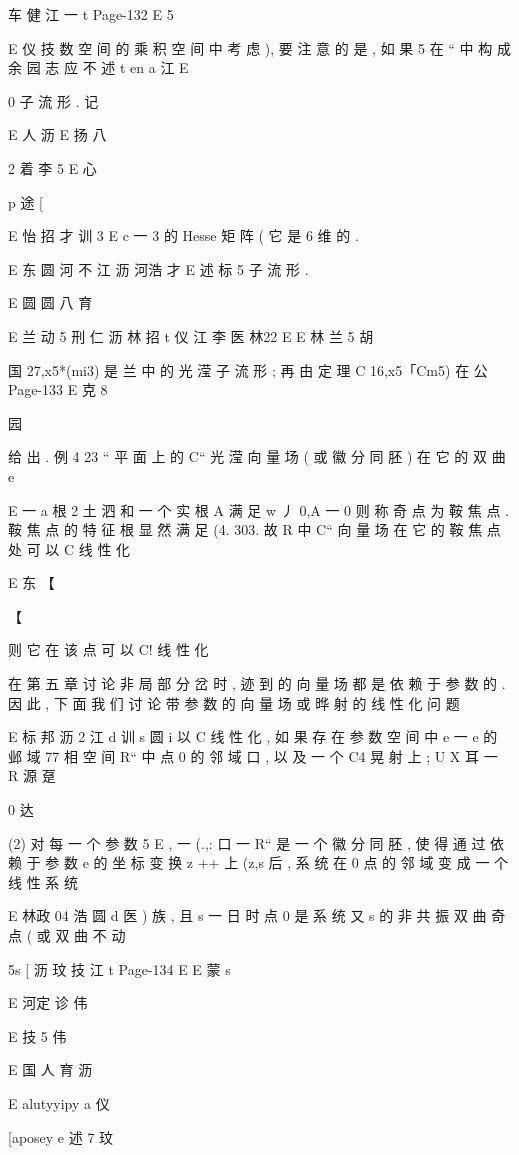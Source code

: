 {{{车 健 江 一 t
Page-132
E 5

E 仪 技
数 空 间 的 乘 积 空 间 中 考 虑 ), 要 注 意 的 是 , 如 果 5 在 “ 中 构 成 余
园 志 应 不 述
t en a 江
E

0
子 流 形 . 记

E 人 沥
E 扬 八

2 着 李 5
E 心

p 途 [

E 怡 招 才 训
3
E c 一 3
的 Hesse 矩 阵 ( 它 是 6 维 的 .

E 东 圆 河 不 江 沥 河浩 才
E 述 标 5
子 流 形 .

E 圆 圆 八 育

E 兰 动 5 刑 仁 沥 林 招 t 仪 江 李
医 林22
E
E 林 兰 5 胡

国
27,x5*(mi3) 是 兰 中 的 光 滢 子 流 形 ; 再 由 定 理 C 16,x5「Cm5) 在 公
Page-133
E 克 8

园

给 出 .
例 4 23 “ 平 面 上 的 C“ 光 滢 向 量 场 ( 或 徽 分 同 胚 ) 在 它 的 双 曲
e

E 一 a
根 2 土 泗 和 一 个 实 根 A 满 足 w 丿 0,A 一 0 则 称 奇 点 为 鞍 焦 点 . 鞍
焦 点 的 特 征 根 显 然 满 足 (4. 303. 故 R 中 C“ 向 量 场 在 它 的 鞍 焦 点
处 可 以 C 线 性 化

E 东
【

【

则 它 在 该 点 可 以 C! 线 性 化

在 第 五 章 讨 论 非 局 部 分 岔 时 , 迹 到 的 向 量 场 都 是 依 赖 于 参 数
的 . 因 此 , 下 面 我 们 讨 论 带 参 数 的 向 量 场 或 晔 射 的 线 性 化 问 题

E 标 邦 沥 2 江 d 训 s
圆
i
以 C 线 性 化 , 如 果 存 在 参 数 空 间 中 e 一 e 的 邺 域 77 相 空 间 R“ 中
点 0 的 邻 域 口 , 以 及 一 个 C4 晃 射 上 ; U X 耳 一 R 源 趸

0 达

(2) 对 每 一 个 参 数 5 E , 一 (.,: 口 一 R“ 是 一 个 徽 分 同 胚 ,
使 得 通 过 依 赖 于 参 数 e 的 坐 标 变 换 z ++ 上 (z,s 后 , 系 统 在 0 点 的
邻 域 变 成 一 个 线 性 系 统

E 林政 04 浩 圆 d
医 ) 族 , 且 s 一 日 时 点 0 是 系 统 又 s 的 非 共 振 双 曲 奇 点 ( 或 双 曲 不 动

5s
[ 沥 玟 技 江
t
Page-134
E E 蒙 s

E 河定 诊 伟

E 技 5 伟

E 国 人 育 沥

E alutyyipy a 仪

[aposey e 述
7 玟

}}}
